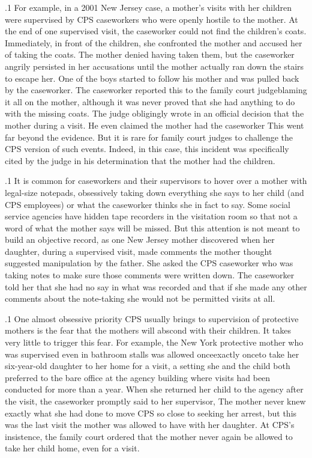 \documentclass[11pt, twoside]{article}
\begin{document}
{\p.1{%
For example, in a 2001 New Jersey case, a mother's visits with her
children were supervised by CPS caseworkers who were openly hostile
to the mother. At the end of one supervised visit, the caseworker could
not find the children's coats. Immediately, in front of the children, she
confronted the mother and accused her of taking the coats. The mother
denied having taken them, but the caseworker angrily persisted in her
accusations until the mother actually ran down the stairs to escape her.
One of the boys started to follow his mother and was pulled back by the
caseworker. The caseworker reported this to the family court
judge\mdash{}blaming it all on the mother, although it was never proved that she had
anything to do with the missing coats. The judge obligingly wrote in
an official decision that the mother  during a visit. He even claimed the mother had 
the caseworker  This went far
beyond the evidence. But it is rare for family court judges to challenge
the CPS version of such events. Indeed, in this case, this incident was
specifically cited by the judge in his determination that the mother had
 the children.
}%

\p.1{%
It is common for caseworkers and their supervisors to hover over a
mother with legal-size notepads, obsessively taking down everything
she says to her child (and CPS employees) or what the caseworker thinks
she in fact  to say. Some social service agencies have hidden tape
recorders in the visitation room so that not a word of what the mother
says will be missed. But this attention is not meant to build an objective
record, as one New Jersey mother discovered when her daughter, during
a supervised visit, made comments the mother thought suggested manipulation by the father. She asked the CPS caseworker who was taking
notes to make sure those comments were written down. The caseworker
told her that she had no say in what was recorded and that if she made
any other comments about the note-taking she would not be permitted
visits at all.
}%

\p.1{%
One almost obsessive priority CPS usually brings to supervision of
protective mothers is the fear that the mothers will abscond with their
children. It takes very little to trigger this fear. For example, the New
York protective mother who was supervised even in bathroom stalls was
allowed once\mdash{}exactly once\mdash{}to take her six-year-old daughter to her
home for a visit, a setting she and the child both preferred to the bare
office at the agency building where visits had been conducted for more
than a year. When she returned her child to the agency after the visit, the
caseworker promptly said to her supervisor,  The mother never knew exactly what
she had done to move CPS so close to seeking her arrest, but this was the
last  visit the mother was allowed to have with her daughter. At
CPS's insistence, the family court ordered that the mother never again
be allowed to take her child home, even for a visit.
}%

}
\end{document}
